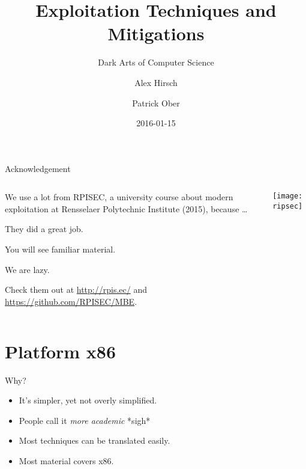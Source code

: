 \documentclass[beamer]{uibk}
\title{Exploitation Techniques and Mitigations}
\subtitle{Dark Arts of Computer Science}
\author{Alex Hirsch \and Patrick Ober}
\date{2016-01-15}
\begin{document}
\maketitle


\begin{frame}{Acknowledgement}
    \begin{columns}
        \begin{column}{0.5\textwidth}
            We use a lot from RPISEC, a university course about modern
            exploitation at Rensselaer Polytechnic Institute (2015), because
            \dots

            \begin{description}
                \item<1->[of them:] They did a great job.
                \item<2->[of you:] You will see familiar material.
                \item<3->[of us:] We are lazy.
            \end{description}

            Check them out at \url{http://rpis.ec/} and
            \url{https://github.com/RPISEC/MBE}.
        \end{column}
        \begin{column}{0.5\textwidth}
            \texttt{[image: ripsec]}
        \end{column}
    \end{columns}
\end{frame}

\section{Platform x86}

\begin{frame}{Why?}
    \begin{itemize}
        \item It's simpler, yet not overly simplified.
        \item People call it \emph{more academic} *sigh*
        \item Most techniques can be translated easily.
        \item Most material covers x86.
    \end{itemize}
\end{frame}
\end{document}
